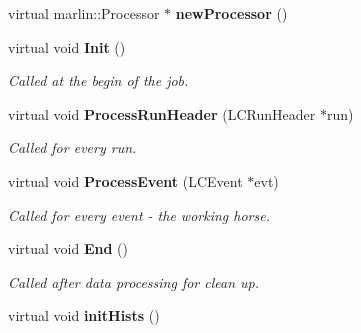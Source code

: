 \begin{DoxyCompactItemize}
\item 
virtual marlin::Processor $\ast$ {\bfseries newProcessor} ()\label{classTBTrackMokkaCheck_a53be3d2fd82b398eef9af471d4fd1f24}

\item 
virtual void {\bf Init} ()\label{classTBTrackMokkaCheck_abb8d8804a7ad6d130daa617910c82025}

\begin{DoxyCompactList}\small\item\em Called at the begin of the job. \item\end{DoxyCompactList}\item 
virtual void {\bf ProcessRunHeader} (LCRunHeader $\ast$run)\label{classTBTrackMokkaCheck_ae3ce319a159844c0b5eb130b52f823df}

\begin{DoxyCompactList}\small\item\em Called for every run. \item\end{DoxyCompactList}\item 
virtual void {\bf ProcessEvent} (LCEvent $\ast$evt)\label{classTBTrackMokkaCheck_ab7f2e45d6b34e294acf7be9084915031}

\begin{DoxyCompactList}\small\item\em Called for every event -\/ the working horse. \item\end{DoxyCompactList}\item 
virtual void {\bf End} ()\label{classTBTrackMokkaCheck_a10638273c995610da878db1eec2d27f6}

\begin{DoxyCompactList}\small\item\em Called after data processing for clean up. \item\end{DoxyCompactList}\item 
virtual void {\bfseries initHists} ()\label{classTBTrackMokkaCheck_a8c6b1f94938fcfb5a5aa4639135dac83}

\end{DoxyCompactItemize}
